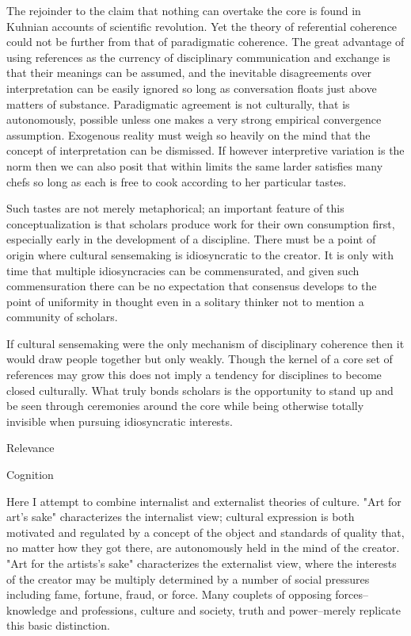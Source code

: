 The rejoinder to the claim that nothing can overtake the core is found
in Kuhnian accounts of scientific revolution. Yet the theory of
referential coherence could not be further from that of paradigmatic
coherence. The great advantage of using references as the currency of
disciplinary communication and exchange is that their meanings can be
assumed, and the inevitable disagreements over interpretation can be
easily ignored so long as conversation floats just above matters of
substance. Paradigmatic agreement is not culturally, that is
autonomously, possible unless one makes a very strong empirical
convergence assumption. Exogenous reality must weigh so heavily on the
mind that the concept of interpretation can be dismissed. If however
interpretive variation is the norm then we can also posit that within
limits the same larder satisfies many chefs so long as each is free to
cook according to her particular tastes.

Such tastes are not merely metaphorical; an important feature of this
conceptualization is that scholars produce work for their own
consumption first, especially early in the development of a discipline.
There must be a point of origin where cultural sensemaking is
idiosyncratic to the creator. It is only with time that multiple
idiosyncracies can be commensurated, and given such commensuration there
can be no expectation that consensus develops to the point of uniformity
in thought even in a solitary thinker not to mention a community of
scholars.

If cultural sensemaking were the only mechanism of disciplinary
coherence then it would draw people together but only weakly. Though the
kernel of a core set of references may grow this does not imply a
tendency for disciplines to become closed culturally. What truly bonds
scholars is the opportunity to stand up and be seen through ceremonies
around the core while being otherwise totally invisible when pursuing
idiosyncratic interests.

Relevance
~~~~~~~~~

Cognition
~~~~~~~~~

Here I attempt to combine internalist and externalist theories of
culture. "Art for art's sake" characterizes the internalist view;
cultural expression is both motivated and regulated by a concept of the
object and standards of quality that, no matter how they got there, are
autonomously held in the mind of the creator. "Art for the artists's
sake" characterizes the externalist view, where the interests of the
creator may be multiply determined by a number of social pressures
including fame, fortune, fraud, or force. Many couplets of opposing
forces--knowledge and professions, culture and society, truth and
power--merely replicate this basic distinction.


